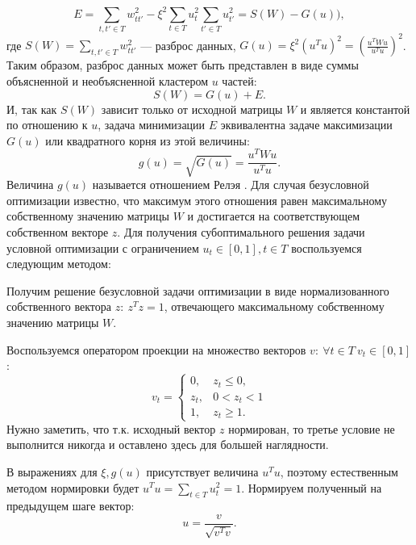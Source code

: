 \documentclass[12pt]{article}
\newenvironment{enumerate*}%
{\begin{enumerate}%
	\setlength{\itemsep}{0pt}%
	\setlength{\parskip}{0pt}}%
{\end{enumerate}}
\begin{document}
\begin{equation}
	E = \sum_{t,t'\in T}w_{tt'}^2-\xi^2 \sum_{t\in T}u_t^2 \sum_{t'\in T}u_{t'}^2 = S(W) - G(u)),
\end{equation}
где $S(W)=\sum_{t,t'\in T}w_{tt'}^2$ --- разброс данных, $G(u) = \xi^2 (u^Tu)^2= \left(\frac{u^TWu}{u^Tu}\right)^2$. Таким образом, разброс данных может быть представлен в виде суммы объясненной и необъясненной кластером $u$ частей:
\begin{equation}
	S(W)=G(u)+E.
\end{equation}
И, так как $S(W)$ зависит только от исходной матрицы $W$ и является константой по отношению к $u$, задача минимизации $E$ эквивалентна задаче максимизации $G(u)$ или квадратного корня из этой величины:
\begin{equation}
	g(u)=\sqrt{G(u)} = \frac{u^TWu}{u^Tu}.
	\label{eq:rayleigh}
\end{equation}
Величина  $g(u)$ называется отношением Релэя \cite{parlett1998symmetric}. Для случая безусловной оптимизации известно, что максимум этого отношения равен максимальному собственному значению матрицы $W$ и достигается на соответствующем собственном векторе $z$. Для получения субоптимального решения задачи условной оптимизации с ограничением $u_t\in[0, 1], t\in T$ воспользуемся следующим методом:
\begin{enumerate*}
	\item Получим решение безусловной задачи оптимизации в виде нормализованного собственного вектора $z:\ z^Tz=1$, отвечающего максимальному собственному значению матрицы $W$.
	\item Воспользуемся оператором проекции на множество векторов ${v:\ \forall t\in T\ v_t\in[0, 1]}$:
	\begin{equation}
		v_t =\begin{cases}
		0, & z_t \leq 0,\\
		z_t, & 0<z_t<1\\
		1, & z_t\geq 1.
		\end{cases}
	\end{equation}
	Нужно заметить, что т.к. исходный вектор $z$ нормирован, то третье условие не выполнится никогда и оставлено здесь для большей наглядности.
	\item В выражениях для $\xi, g(u)$ присутствует величина $u^Tu$, поэтому естественным методом нормировки будет $u^Tu=\sum_{t\in T} u_t^2=1$. Нормируем полученный на предыдущем шаге вектор:
	\begin{equation}
		u = \frac{v}{\sqrt{v^Tv}}.
	\end{equation}
\end{enumerate*}
\end{document}
